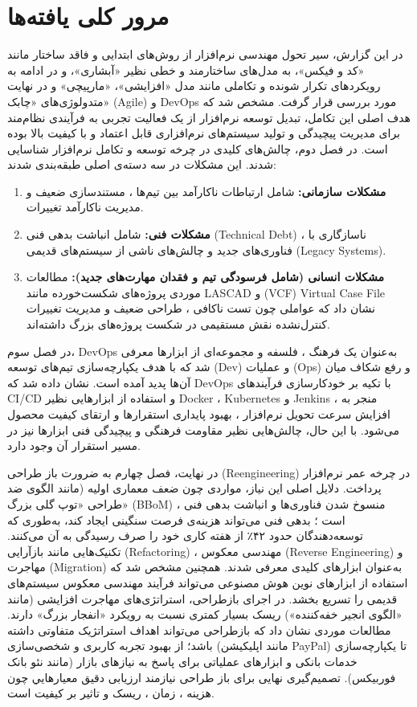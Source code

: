 \section{مرور کلی یافته‌ها}
\label{sec:ch6-findings-overview}

در این گزارش، سیر تحول مهندسی نرم‌افزار از روش‌های ابتدایی و فاقد ساختار مانند «کد و فیکس»، به مدل‌های ساختارمند و خطی نظیر «آبشاری»، و در ادامه به رویکردهای تکرار شونده و تکاملی مانند مدل «افزایشی»، «مارپیچی» و در نهایت متدولوژی‌های «چابک» (Agile) و DevOps مورد بررسی قرار گرفت. مشخص شد که هدف اصلی این تکامل، تبدیل توسعه نرم‌افزار از یک فعالیت تجربی به فرآیندی نظام‌مند برای مدیریت پیچیدگی و تولید سیستم‌های نرم‌افزاری قابل اعتماد و با کیفیت بالا بوده است.
در فصل دوم، چالش‌های کلیدی در چرخه توسعه و تکامل نرم‌افزار شناسایی شدند. این مشکلات در سه دسته‌ی اصلی طبقه‌بندی شدند:

\begin{enumerate}
    \item \textbf{مشکلات سازمانی:} شامل ارتباطات ناکارآمد بین تیم‌ها ، مستندسازی ضعیف و مدیریت ناکارآمد تغییرات.
    \item \textbf{مشکلات فنی:} شامل انباشت بدهی فنی (Technical Debt) ، ناسازگاری با فناوری‌های جدید و چالش‌های ناشی از سیستم‌های قدیمی (Legacy Systems).
    \item \textbf{مشکلات انسانی (شامل فرسودگی تیم و فقدان مهارت‌های جدید):} مطالعات موردی پروژه‌های شکست‌خورده مانند LASCAD و (VCF) Virtual Case File نشان داد که عواملی چون تست ناکافی ، طراحی ضعیف و مدیریت تغییرات کنترل‌نشده نقش مستقیمی در شکست پروژه‌های بزرگ داشته‌اند.
\end{enumerate}

در فصل سوم، DevOps به‌عنوان یک فرهنگ ، فلسفه و مجموعه‌ای از ابزارها معرفی شد که با هدف یکپارچه‌سازی تیم‌های توسعه (Dev) و عملیات (Ops) و رفع شکاف میان آن‌ها پدید آمده است. نشان داده شد که DevOps با تکیه بر خودکارسازی فرآیندهای CI/CD و استفاده از ابزارهایی نظیر Docker ، Kubernetes و Jenkins ، منجر به افزایش سرعت تحویل نرم‌افزار ، بهبود پایداری استقرارها و ارتقای کیفیت محصول می‌شود. با این حال، چالش‌هایی نظیر مقاومت فرهنگی و پیچیدگی فنی ابزارها نیز در مسیر استقرار آن وجود دارد.

در نهایت، فصل چهارم به ضرورت باز طراحی (Reengineering) در چرخه عمر نرم‌افزار پرداخت. دلایل اصلی این نیاز، مواردی چون ضعف معماری اولیه (مانند الگوی ضد طراحی «توپ گلی بزرگ» (BBoM) ، منسوخ شدن فناوری‌ها و انباشت بدهی فنی است ؛ بدهی فنی می‌تواند هزینه‌ی فرصت سنگینی ایجاد کند، به‌طوری که توسعه‌دهندگان حدود ۴۲٪ از هفته کاری خود را صرف رسیدگی به آن می‌کنند. تکنیک‌هایی مانند بازآرایی (Refactoring) ، مهندسی معکوس (Reverse Engineering) و مهاجرت (Migration) به‌عنوان ابزارهای کلیدی معرفی شدند. همچنین مشخص شد که استفاده از ابزارهای نوین هوش مصنوعی می‌تواند فرآیند مهندسی معکوس سیستم‌های قدیمی را تسریع بخشد. در اجرای بازطراحی، استراتژی‌های مهاجرت افزایشی (مانند «الگوی انجیر خفه‌کننده») ریسک بسیار کمتری نسبت به رویکرد «انفجار بزرگ» دارند. مطالعات موردی نشان داد که بازطراحی می‌تواند اهداف استراتژیک متفاوتی داشته باشد؛ از بهبود تجربه کاربری و شخصی‌سازی (مانند اپلیکیشن PayPal) تا یکپارچه‌سازی خدمات بانکی و ابزارهای عملیاتی برای پاسخ به نیازهای بازار (مانند نئو بانک فوربیکس). تصمیم‌گیری نهایی برای باز طراحی نیازمند ارزیابی دقیق معيارهايي چون هزینه ، زمان ، ریسک و تاثیر بر کیفیت است.

